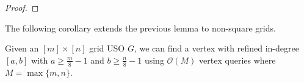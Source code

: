 \documentclass[runningheads,a4paper]{llncs}
\newcommand{\MM}[1]{\marginpar{\parbox{4cm}{{\small {\bf MM:} #1}}}} %
\newcommand{\indegree}{refined in-degree\xspace}
\begin{document}
\begin{proof}
\end{proof}

The following corollary extends the previous lemma to non-square grids.

\begin{corollary}\label{corollary: n/4 indegree}
  Given an $[m]\times [n]$ grid USO $G$, we can find a vertex with \indegree $[a,b]$ with $a \geq \frac{m}{8} - 1$ and  $b \geq \frac{n}{8} - 1$ using $\mathcal{O}(M)$ vertex queries where $M = \max\{m,n\}$.
\end{corollary}
\end{document}
